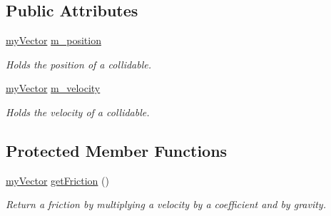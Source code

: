 \subsection*{Public Attributes}
\begin{DoxyCompactItemize}
\item 
\hypertarget{class_collidable_abb12d204a079d68951d396005270c70b}{}\hyperlink{classmy_vector}{my\+Vector} \hyperlink{class_collidable_abb12d204a079d68951d396005270c70b}{m\+\_\+position}\label{class_collidable_abb12d204a079d68951d396005270c70b}

\begin{DoxyCompactList}\small\item\em Holds the position of a collidable. \end{DoxyCompactList}\item 
\hypertarget{class_collidable_adfeaec03dc9c1c5791b7bc94cff04c44}{}\hyperlink{classmy_vector}{my\+Vector} \hyperlink{class_collidable_adfeaec03dc9c1c5791b7bc94cff04c44}{m\+\_\+velocity}\label{class_collidable_adfeaec03dc9c1c5791b7bc94cff04c44}

\begin{DoxyCompactList}\small\item\em Holds the velocity of a collidable. \end{DoxyCompactList}\end{DoxyCompactItemize}
\subsection*{Protected Member Functions}
\begin{DoxyCompactItemize}
\item 
\hyperlink{classmy_vector}{my\+Vector} \hyperlink{class_collidable_a5aaff018202f598eeefd6bc0968d5adb}{get\+Friction} ()
\begin{DoxyCompactList}\small\item\em Return a friction by multiplying a velocity by a coefficient and by gravity. \end{DoxyCompactList}\end{DoxyCompactItemize}
